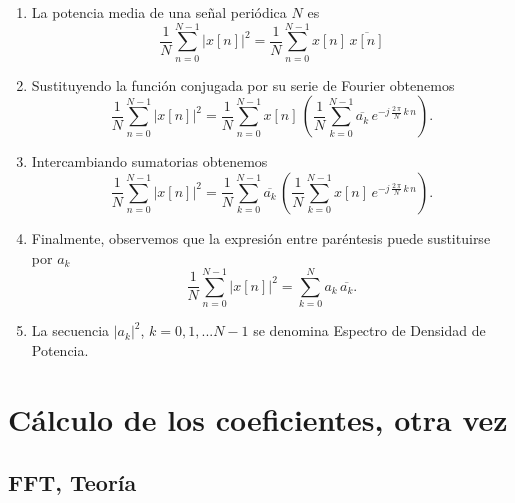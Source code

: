 \begin{enumerate}

\item La potencia media de una se\~{n}al peri\'{o}dica $N$ es
\begin{equation}
        \frac{1}{N}\sum_{n=0}^{N-1}\left| x\left[ n\right]
        \right|^{2}=
        \frac{1}{N}\sum_{n=0}^{N-1} x\left[ n\right] \, \overline{x\left[ n \right]}
\end{equation}

\item Sustituyendo la funci\'{o}n conjugada por su serie de Fourier obtenemos
\begin{equation}
        \frac{1}{N}\sum_{n=0}^{N-1}\left| x\left[ n\right]
        \right|^{2}=
        \frac{1}{N} \sum_{n=0}^{N-1} x\left[ n\right] \, 
        \left(\frac{1}{N}\sum_{k=0}^{N-1} \overline{a_{k}} \, e^{-j \, \frac{2 \, \pi}{N} \, k \, n} \right).
\end{equation}

\item Intercambiando sumatorias obtenemos
\begin{equation}
        \frac{1}{N}\sum_{n=0}^{N-1}\left| x\left[ n\right]
        \right|^{2}=
        \frac{1}{N}\sum_{k=0}^{N-1} \overline{a_{k}}  \, \left(
        \frac{1}{N}\sum_{k=0}^{N-1} x\left[ n\right]  \, e^{-j \, \frac{2 \, \pi}{N} \, k \, n} \right).
\end{equation}

\item Finalmente, observemos que la expresi\'{o}n entre par\'{e}ntesis
  puede sustituirse por $a_{k}$
\begin{equation}
        \frac{1}{N}\sum_{n=0}^{N-1}\left| x\left[ n\right]
        \right|^{2}=
        \sum_{k=0}^{N} a_{k} \, \overline{a_{k}}.
\end{equation}

\item La secuencia $|a_{k}|^{2}$, $k = 0, 1, ... N - 1$ se denomina Espectro
de Densidad de Potencia.

\end{enumerate}

\section{C\'{a}lculo de los coeficientes, otra vez}

\subsection{FFT, Teoría}

